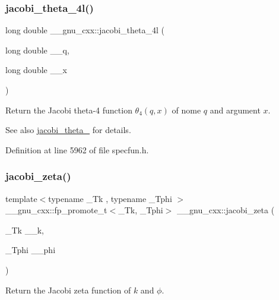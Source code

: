 \subsubsection{\texorpdfstring{jacobi\+\_\+theta\+\_\+4l()}{jacobi\_theta\_4l()}}
{\footnotesize\ttfamily long double \+\_\+\+\_\+gnu\+\_\+cxx\+::jacobi\+\_\+theta\+\_\+4l (\begin{DoxyParamCaption}\item[{long double}]{\+\_\+\+\_\+q,  }\item[{long double}]{\+\_\+\+\_\+x }\end{DoxyParamCaption})\hspace{0.3cm}{\ttfamily [inline]}}

Return the Jacobi theta-\/4 function $ \theta_4(q,x) $ of nome $ q $ and argument $ x $.

\begin{DoxySeeAlso}{See also}
\hyperlink{group__gnu__math__spec__func_ga676501b6284d5702a3dc61252e6c78ab}{jacobi\+\_\+theta\+\_} for details. 
\end{DoxySeeAlso}


Definition at line 5962 of file specfun.\+h.

\mbox{\label{group__gnu__math__spec__func_ga639be4ebef9a20572375ec534be52b07}} 
\subsubsection{\texorpdfstring{jacobi\+\_\+zeta()}{jacobi\_zeta()}}
{\footnotesize\ttfamily template$<$typename \+\_\+\+Tk , typename \+\_\+\+Tphi $>$ \\
\+\_\+\+\_\+gnu\+\_\+cxx\+::fp\+\_\+promote\+\_\+t$<$\+\_\+\+Tk, \+\_\+\+Tphi$>$ \+\_\+\+\_\+gnu\+\_\+cxx\+::jacobi\+\_\+zeta (\begin{DoxyParamCaption}\item[{\+\_\+\+Tk}]{\+\_\+\+\_\+k,  }\item[{\+\_\+\+Tphi}]{\+\_\+\+\_\+phi }\end{DoxyParamCaption})\hspace{0.3cm}{\ttfamily [inline]}}

Return the Jacobi zeta function of $ k $ and $ \phi $.

